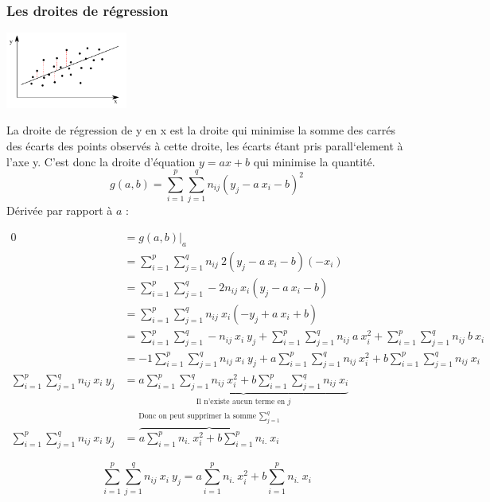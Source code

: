 \newpage
\subsubsection{Les droites de régression}

\begin{center}
	\includegraphics[width=0.3\textwidth]{images/droite_de_regression.pdf}
\end{center}
La droite de régression de y en x est la droite qui minimise la somme des carrés des écarts des points observés à cette droite, les écarts étant pris parall`element à l'axe y. C'est donc la droite d'équation $y = ax+b$ qui minimise la quantité.
$$\boxed{g(a,b) = \sum_{i=1}^{p} \sum_{j=1}^{q} n_{ij} (y_j - a\ x_i - b)^2}$$
Dérivée par rapport à $a$ :
\begin{center}
	$\begin{array}{RL}
		0 &= \left.g(a,b)\right|_a\\
		  &= \sum_{i=1}^{p} \sum_{j=1}^{q} n_{ij}\ 2(y_j - a\ x_i-b)(-x_i)\\
		  &= \sum_{i=1}^{p} \sum_{j=1}^{q} -2n_{ij}\ x_i(y_j - a\ x_i - b)\\
		  &= \sum_{i=1}^{p} \sum_{j=1}^{q} n_{ij}\ x_i(-y_j + a\ x_i + b)\\
		  &= \sum_{i=1}^{p} \sum_{j=1}^{q} -n_{ij}\ x_i\ y_j + \sum_{i=1}^{p} \sum_{j=1}^{q} n_{ij}\ a\ x_i^2 + \sum_{i=1}^{p} \sum_{j=1}^{q} n_{ij}\ b\ x_i\\
		  &= -1 \sum_{i=1}^{p} \sum_{j=1}^{q} n_{ij}\ x_i\ y_j + a \sum_{i=1}^{p} \sum_{j=1}^{q} n_{ij}\ x_i^2 + b \sum_{i=1}^{p} \sum_{j=1}^{q} n_{ij}\ x_i\\
		  \sum_{i=1}^{p} \sum_{j=1}^{q} n_{ij}\ x_i\ y_j  &= \underbrace{a \sum_{i=1}^{p} \sum_{j=1}^{q} n_{ij}\ x_i^2 + b \sum_{i=1}^{p} \sum_{j=1}^{q} n_{ij}\ x_i}_\text{Il n'existe aucun terme en $j$}\\
		\sum_{i=1}^{p} \sum_{j=1}^{q} n_{ij}\ x_i\ y_j  &= \overbrace{a \sum_{i=1}^{p} n_{i.}\ x_i^2 + b \sum_{i=1}^{p} n_{i.}\ x_i}^\text{Donc on peut supprimer la somme $\sum_{j=1}^{q}$}
	\end{array}$
\end{center}
$$\boxed{\sum_{i=1}^{p} \sum_{j=1}^{q} n_{ij}\ x_i\ y_j = a \sum_{i=1}^{p} n_{i.}\ x_i^2 + b \sum_{i=1}^{p} n_{i.}\ x_i}$$
